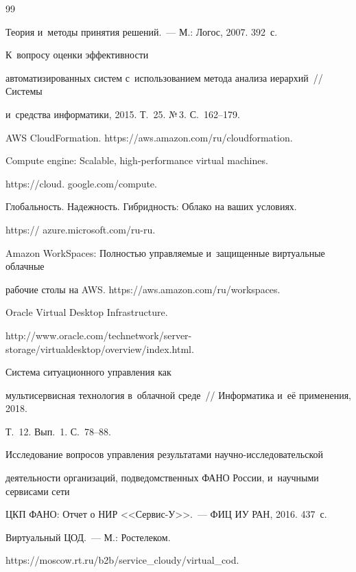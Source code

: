 {{\begin{thebibliography}{99}

Теория и~методы принятия решений.~--- М.: Логос, 2007. 392~с.


   К~вопросу оценки эффективности 

автоматизированных систем с~использованием метода анализа иерархий~/\!\!/ Системы 

и~средства информатики, 2015. Т.~25. №\,3. С.~162--179.


  AWS CloudFormation. {\sf https://aws.amazon.com/ru/cloudformation.}


  Compute engine: Scalable, high-performance virtual machines. {\sf 

https://cloud. google.com/compute.} 


  Глобальность. Надежность. Гибридность: Облако на ваших условиях. {\sf 

https:// azure.microsoft.com/ru-ru.}


  Amazon WorkSpaces: Полностью управляемые и~защищенные виртуальные облачные 

рабочие столы на AWS. {\sf https://aws.amazon.com/ru/workspaces}.


  Oracle Virtual Desktop Infrastructure. {\sf  

http://www.oracle.com/technetwork/server-storage/virtualdesktop/overview/index.html.} 


   Система ситуационного управления как 

мультисервисная технология в~облачной среде~/\!\!/ Информатика и~её применения, 2018. 

Т.~12. Вып.~1. С.~78--88.


  Исследование вопросов управления результатами на\-уч\-но-ис\-сле\-до\-ва\-тель\-ской 

деятельности организаций, подведомственных ФАНО России, и~научными сервисами сети 

ЦКП ФАНО: Отчет о НИР <<Сервис-У>>.~--- ФИЦ ИУ РАН, 2016. 437~с.


  Виртуальный ЦОД.~--- М.: Ростелеком. {\sf 

https://moscow.rt.ru/b2b/service\_cloudy/\linebreak virtual\_cod.}

        \end{thebibliography}

} }





